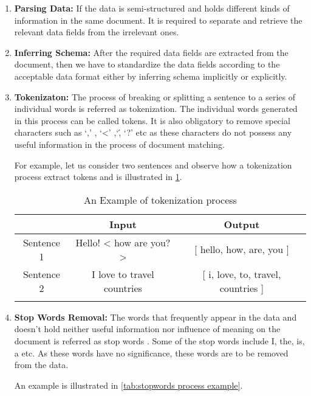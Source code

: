 \begin{enumerate}
\item \textbf{Parsing Data:} If the data is semi-structured and holds different kinds of information in the same document. It is required to separate and retrieve the relevant data fields from the irrelevant ones.

\item \textbf{Inferring Schema:} After the required data fields are extracted from the document, then we have to standardize the data fields according to the acceptable data format either by inferring schema implicitly or explicitly.

\item \textbf{Tokenizaton:} The process of breaking or splitting a sentence to a series of individual words is referred as tokenization. The individual words generated in this process can be called tokens. It is also obligatory to remove special characters such as `,' , `<' ,`\' , `?' etc as these characters do not possess any useful information in the process of document matching.

\par For example, let us consider two sentences and observe how a tokenization process extract tokens and is illustrated in \ref{tab:tokenization process example}.

\begin{table}[htbp]
	\centering
		\begin{tabular}{ccc}\toprule
			& Input & Output\\\midrule
		Sentence 1 & Hello! < how are you?> & [ hello, how, are, you ]\\\addlinespace 
		Sentence 2 &  I love to travel countries & [ i, love, to, travel, countries ] \\\addlinespace
			\bottomrule
		\end{tabular}
	\caption{An Example of tokenization process}
	\label{tab:tokenization process example}
\end{table}



\item \textbf{Stop Words Removal:} The words that frequently appear in the data and doesn't hold neither useful information nor influence of meaning on the document is referred as stop words \cite{fox1989stop}. Some of the stop words include I, the, is, a etc. As these words have no significance, these words are to be removed from the data.

\par An example is illustrated in \ref{tab:stopwords process example}.


\end{enumerate}
